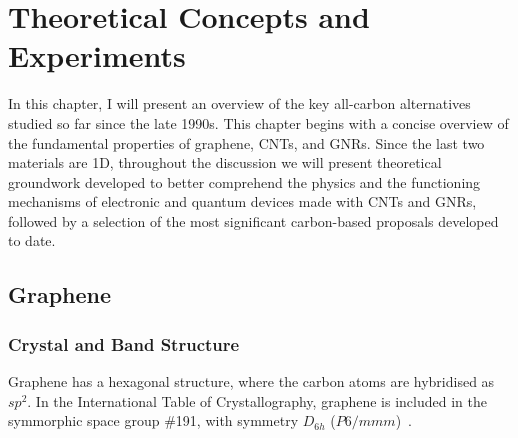 \chapter{Theoretical Concepts and Experiments}\label{ch:introduction}

\minitoc

%
In this chapter, I will present an overview of the key all-carbon alternatives studied so far since the late 1990s. This chapter begins with a concise overview of the fundamental properties of graphene, \glspl{CNT}, and \glspl{GNR}. Since the last two materials are 1D, throughout the discussion we will present theoretical groundwork developed to better comprehend the physics and the functioning mechanisms of electronic and quantum devices made with \glspl{CNT} and \glspl{GNR}, followed by a selection of the most significant carbon-based proposals developed to date.

\section{Graphene}\label{intro:sec:graphene}

\subsection{Crystal and Band Structure}
Graphene has a hexagonal structure, where the carbon atoms are hybridised as $sp^2$. In the International Table of Crystallography, graphene is included in the symmorphic space group \#191, with symmetry $D_{6h}$ ($P6/mmm$)~\cite{dresselhaus2007group}.

